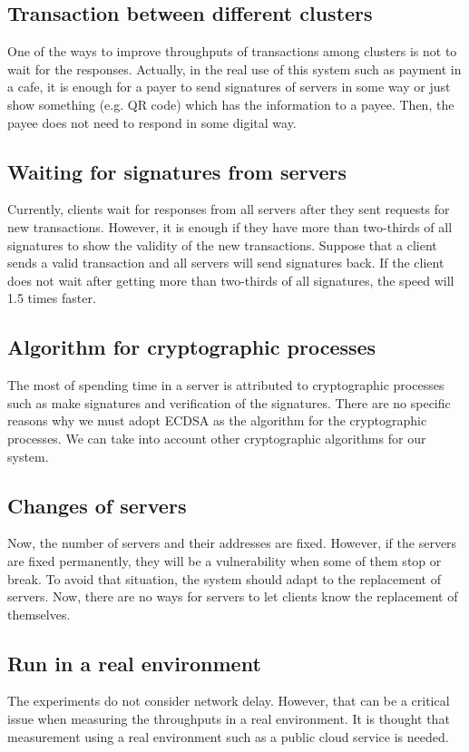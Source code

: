 \documentclass[a4paper, oneside]{discothesis}
\begin{document}
\subsection{Transaction between different clusters}
One of the ways to improve throughputs of transactions among clusters is not to wait
for the responses.
Actually, in the real use of this system such as payment in a cafe,
it is enough for a payer to send signatures of servers in some way
or just show something (e.g. QR code) which has the information to a payee.
Then, the payee does not need to respond in some digital way.


\subsection{Waiting for signatures from servers}
Currently, clients wait for responses from all servers
after they sent requests for new transactions.
However, it is enough if they have more than two-thirds of all signatures
to show the validity of the new transactions.
Suppose that a client sends a valid transaction and all servers will send signatures back.
If the client does not wait after getting more than two-thirds of all signatures,
the speed will 1.5 times faster.


\subsection{Algorithm for cryptographic processes}
The most of spending time in a server is attributed to cryptographic processes
such as make signatures and verification of the signatures.
There are no specific reasons why we must adopt ECDSA as the algorithm
for the cryptographic processes.
We can take into account other cryptographic algorithms for our system.


\subsection{Changes of servers}
Now, the number of servers and their addresses are fixed.
However, if the servers are fixed permanently, they will be a vulnerability
when some of them stop or break.
To avoid that situation, the system should adapt to the replacement of servers.
Now, there are no ways for servers to let clients know the replacement of themselves.

\subsection{Run in a real environment}
The experiments do not consider network delay.
However, that can be a critical issue when measuring the throughputs in a real environment.
It is thought that measurement using a real environment such as a public cloud service is needed.
\end{document}
